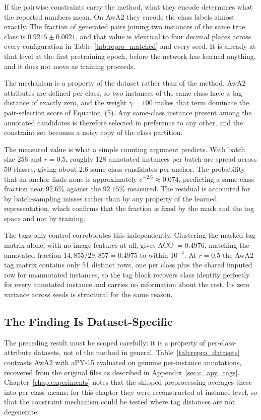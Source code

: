 If the pairwise constraints carry the method, what they encode determines what the reported numbers mean. On AwA2 they encode the class labels almost exactly. The fraction of generated pairs joining two instances of the same true class is $0.9215 \pm 0.0021$, and that value is identical to four decimal places across every configuration in Table~\ref{tab:repro_matched} and every seed. It is already at that level at the first pretraining epoch, before the network has learned anything, and it does not move as training proceeds.

The mechanism is a property of the dataset rather than of the method. AwA2 attributes are defined per class, so two instances of the same class have a tag distance of exactly zero, and the weight $\gamma = 100$ makes that term dominate the pair-selection score of Equation~(5). Any same-class instance present among the annotated candidates is therefore selected in preference to any other, and the constraint set becomes a noisy copy of the class partition.

The measured value is what a simple counting argument predicts. With batch size 256 and $r = 0.5$, roughly 128 annotated instances per batch are spread across 50 classes, giving about 2.6 same-class candidates per anchor. The probability that an anchor finds none is approximately $e^{-2.6} \approx 0.074$, predicting a same-class fraction near $92.6\%$ against the $92.15\%$ measured. The residual is accounted for by batch-sampling misses rather than by any property of the learned representation, which confirms that the fraction is fixed by the mask and the tag space and not by training.

The tags-only control corroborates this independently. Clustering the masked tag matrix alone, with no image features at all, gives ACC $= 0.4976$, matching the annotated fraction $14{,}855/29{,}857 = 0.4975$ to within $10^{-4}$. At $r = 0.5$ the AwA2 tag matrix contains only 51 distinct rows, one per class plus the shared imputed row for unannotated instances, so the tag block recovers class identity perfectly for every annotated instance and carries no information about the rest. Its zero variance across seeds is structural for the same reason.

\subsection{The Finding Is Dataset-Specific}
\label{subsec:repro_scope}

The preceding result must be scoped carefully: it is a property of per-class-attribute datasets, not of the method in general. Table~\ref{tab:repro_datasets} contrasts AwA2 with aPY-15 evaluated on genuine per-instance annotations, recovered from the original files as described in Appendix~\ref{sec:c_apy_tags}. Chapter~\ref{chap:experiments} notes that the shipped preprocessing averages these into per-class means; for this chapter they were reconstructed at instance level, so that the constraint mechanism could be tested where tag distances are not degenerate.

